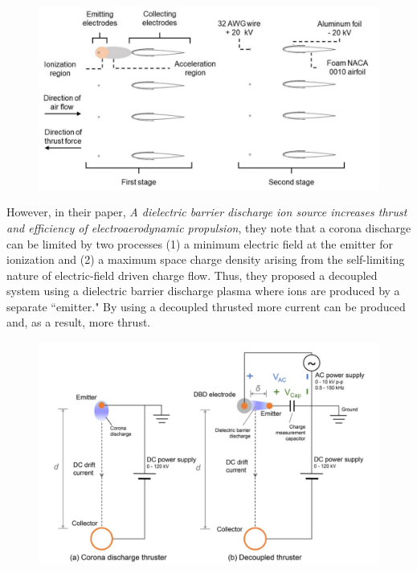 \documentclass[12pt]{article}
\begin{document}
\begin{figure}[H]
\centering
\includegraphics[width=\linewidth]{images/thrustdiagram.pdf}
\end{figure}

\par
However, in their paper, \textit{A dielectric barrier discharge ion source increases thrust and efficiency of electroaerodynamic propulsion}, they note that a corona discharge can be limited by two processes (1) a minimum electric field at the emitter for ionization and (2) a maximum space charge density arising from the self-limiting nature of electric-field driven charge flow. Thus, they proposed a decoupled system using a dielectric barrier discharge plasma where ions are produced by a separate ``emitter." By using a decoupled thrusted more current can be produced and, as a result, more thrust. 

\begin{figure}[H]
\centering
\includegraphics[width=\linewidth]{images/dbd thruster schematic.pdf}
\end{figure}
\end{document}
